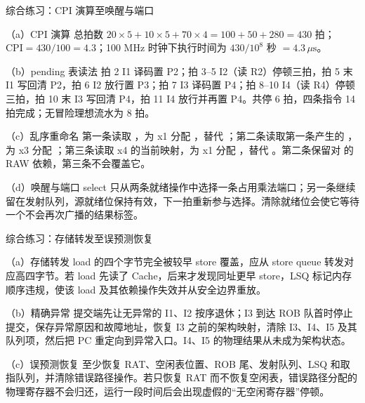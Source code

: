 \begin{chapteranswer}{综合练习：CPI 演算至唤醒与端口}
\begin{answersubproblem}{（a）CPI 演算}
总拍数 $20\times5+10\times5+70\times4=100+50+280=430$ 拍；$\mathrm{CPI}=430/100=4.3$；100 MHz 时钟下执行时间为 $430/10^{8}$ 秒 $=4.3\,\mu\mathrm{s}$。
\end{answersubproblem}
\begin{answersubproblem}{（b）pending 表读法}
拍 2 I1 译码置 P2；拍 3--5 I2（读 R2）停顿三拍，拍 5 末 I1 写回清 P2，拍 6 I2 放行置 P3；拍 7 I3 译码置 P4；拍 8--10 I4（读 R4）停顿三拍，拍 10 末 I3 写回清 P4，拍 11 I4 放行并再置 P4。共停 6 拍，四条指令 14 拍完成；无冒险理想流水为 8 拍。
\end{answersubproblem}
\begin{answersubproblem}{（c）乱序重命名}
第一条读取 ，为 x1 分配 ，替代 ；第二条读取第一条产生的 ，为 x3 分配 ；第三条读取 x4 的当前映射，为 x1 分配 ，替代 。第二条保留对  的 RAW 依赖，第三条不会覆盖它。
\end{answersubproblem}
\begin{answersubproblem}{（d）唤醒与端口}
select 只从两条就绪操作中选择一条占用乘法端口；另一条继续留在发射队列，源就绪位保持有效，下一拍重新参与选择。清除就绪位会使它等待一个不会再次广播的结果标签。
\end{answersubproblem}
\end{chapteranswer}

\begin{chapteranswer}{综合练习：存储转发至误预测恢复}
\begin{answersubproblem}{（a）存储转发}
load 的四个字节完全被较早 store 覆盖，应从 store queue 转发对应高四字节。若 load 先读了 Cache，后来才发现同址更早 store，LSQ 标记内存顺序违规，使该 load 及其依赖操作失效并从安全边界重放。
\end{answersubproblem}
\begin{answersubproblem}{（b）精确异常}
提交端先让无异常的 I1、I2 按序退休；I3 到达 ROB 队首时停止提交，保存异常原因和故障地址，恢复 I3 之前的架构映射，清除 I3、I4、I5 及其队列项，然后把 PC 重定向到异常入口。I4、I5 的物理结果从未成为架构状态。
\end{answersubproblem}
\begin{answersubproblem}{（c）误预测恢复}
至少恢复 RAT、空闲表位置、ROB 尾、发射队列、LSQ 和取指队列，并清除错误路径操作。若只恢复 RAT 而不恢复空闲表，错误路径分配的物理寄存器不会归还，运行一段时间后会出现虚假的“无空闲寄存器”停顿。
\end{answersubproblem}
\end{chapteranswer}

